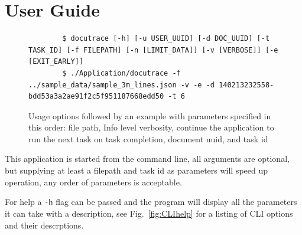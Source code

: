 \documentclass[11pt]{article}
\newcommand{\code}[1]{\colorbox{light-gray}{\texttt{#1}}}
\begin{document}
\newpage
\section{User Guide}

\begin{figure}[h]
    \begin{verbatim}
        $ docutrace [-h] [-u USER_UUID] [-d DOC_UUID] [-t TASK_ID] [-f FILEPATH] [-n [LIMIT_DATA]] [-v [VERBOSE]] [-e [EXIT_EARLY]]
        $ ./Application/docutrace -f ../sample_data/sample_3m_lines.json -v -e -d 140213232558-bdd53a3a2ae91f2c5f951187668edd50 -t 6
    \end{verbatim}
    \caption{Usage options followed by an example with parameters specified in this order: file path, Info level verbosity, continue the application to run the next task on task completion, document uuid, and task id}
    \label{fig:CLIOpts}
\end{figure}

This application is started from the command line, all arguments are optional, but supplying at least a filepath and task id as parameters will speed up operation, any order of parameters is acceptable. 

For help a \code{-h} flag can be passed and the program will display all the parameters it can take with a description, see Fig.~\ref{fig:CLIhelp} for a listing of CLI options and their descrptions.
\end{document}
